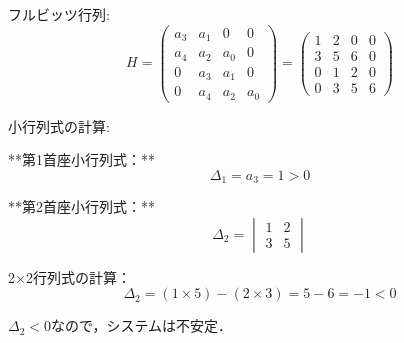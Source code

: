 \documentclass[11pt,a4paper]{ltjsarticle}
\begin{document}
フルビッツ行列:
$$H = \begin{pmatrix} 
a_3 & a_1 & 0 & 0 \\
a_4 & a_2 & a_0 & 0 \\
0 & a_3 & a_1 & 0 \\
0 & a_4 & a_2 & a_0
\end{pmatrix} = \begin{pmatrix} 
1 & 2 & 0 & 0 \\
3 & 5 & 6 & 0 \\
0 & 1 & 2 & 0 \\
0 & 3 & 5 & 6
\end{pmatrix}$$

小行列式の計算:

**第1首座小行列式：**
$$\Delta_1 = a_3 = 1 > 0$$

**第2首座小行列式：**
$$\Delta_2 = \begin{vmatrix} 1 & 2 \\ 3 & 5 \end{vmatrix}$$

2×2行列式の計算：
$$\Delta_2 = (1 \times 5) - (2 \times 3) = 5 - 6 = -1 < 0$$

$\Delta_2 < 0$なので，システムは不安定．
\end{document}
